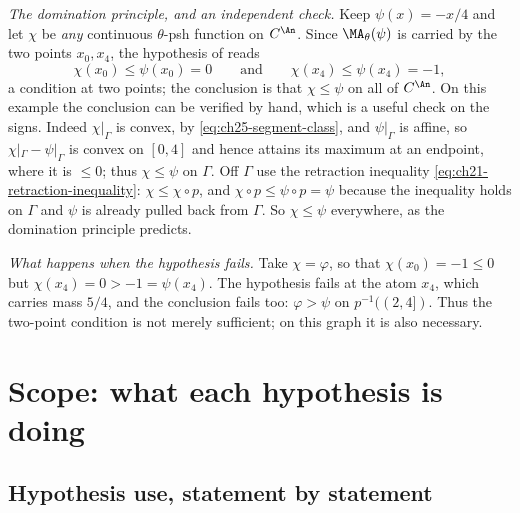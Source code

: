 \begin{example}
\emph{The domination principle, and an independent check.}  Keep
$\psi(x)=-x/4$ and let $\chi$ be \emph{any} continuous $\theta$-psh
function on $C^{\An}$.  Since $\MA_\theta(\psi)$ is carried by the two
points $x_0,x_4$, the hypothesis of
 reads
\[
 \chi(x_0)\leq\psi(x_0)=0
 \qquad\text{and}\qquad
 \chi(x_4)\leq\psi(x_4)=-1 ,
\]
a condition at two points; the conclusion is that $\chi\leq\psi$ on all of
$C^{\An}$.  On this example the conclusion can be verified by hand, which
is a useful check on the signs.  Indeed $\chi|_\Gamma$ is convex, by
\eqref{eq:ch25-segment-class}, and $\psi|_\Gamma$ is affine, so
$\chi|_\Gamma-\psi|_\Gamma$ is convex on $[0,4]$ and hence attains its
maximum at an endpoint, where it is $\leq0$; thus $\chi\leq\psi$ on
$\Gamma$.  Off $\Gamma$ use the retraction inequality
\eqref{eq:ch21-retraction-inequality}: $\chi\leq\chi\circ p$, and
$\chi\circ p\leq\psi\circ p=\psi$ because the inequality holds on
$\Gamma$ and $\psi$ is already pulled back from $\Gamma$.  So
$\chi\leq\psi$ everywhere, as the domination principle predicts.

\emph{What happens when the hypothesis fails.}  Take $\chi=\varphi$, so
that $\chi(x_0)=-1\leq0$ but $\chi(x_4)=0>-1=\psi(x_4)$.  The
hypothesis fails at the atom $x_4$, which carries mass $5/4$, and the
conclusion fails too: $\varphi>\psi$ on $p^{-1}((2,4])$.  Thus the
two-point condition is not merely sufficient; on this graph it is also
necessary.
\end{example}

\section{Scope: what each hypothesis is doing}
\label{sec:ch25-scope}

\subsection{Hypothesis use, statement by statement}
\label{sec:ch25-hypothesis-use}

